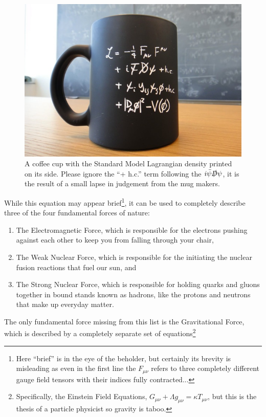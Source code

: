 \begin{figure}
    \centering
    \includegraphics[scale=0.5]{figures/introduction/StandardModelCup.jpg}
    \caption{A coffee cup with the Standard Model Lagrangian density printed on its side. Please ignore the ``+ h.c.'' term following the $i\Bar{\psi}\slashed{D}\psi$, it is the result of a small lapse in judgement from the mug makers.}
    \label{fig:lagrangian_cup}
\end{figure}

While this equation may appear brief\footnote{Here ``brief'' is in the eye of the beholder, but certainly its brevity is misleading as even in the first line the $F_{\mu\nu}$ refers to three completely different gauge field tensors with their indices fully contracted...}, it can be used to completely describe three of the four fundamental forces of nature: 
\begin{enumerate}
    \item The Electromagnetic Force, which is responsible for the electrons pushing against each other to keep you from falling through your chair,
    \item The Weak Nuclear Force,  which is responsible for the initiating the nuclear fusion reactions that fuel our sun, and 
    \item The Strong Nuclear Force,  which is responsible for holding quarks and gluons together in bound stands known as hadrons, like the protons and neutrons that make up everyday matter.
\end{enumerate}
The only fundamental force missing from this list is the Gravitational Force, which is described by a completely separate set of equations\footnote{Specifically, the Einstein Field Equations, $G_{\mu\nu} + \Lambda g_{\mu\nu} = \kappa T_{\mu\nu}$, but this is the thesis of a particle physicist so gravity is taboo.}

